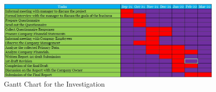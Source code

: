 

\begin{figure}[H]
\centering
\includegraphics[width=15cm]{Gantt Chart.jpg}
    		\caption{{Gantt Chart for the Investigation}}
\end{figure}

